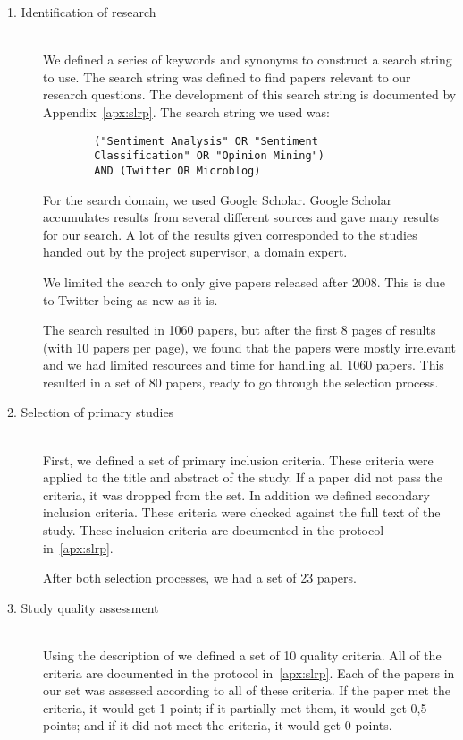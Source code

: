 \begin{description}

	\item[1. Identification of research] \hfill \\
		We defined a series of keywords and synonyms to construct a search string to use. The search string was defined to find papers relevant to our research questions. The development of this search string is documented by Appendix~\ref{apx:slrp}. The search string we used was:
		
		\begin{verbatim}
		("Sentiment Analysis" OR "Sentiment 
		Classification" OR "Opinion Mining") 
		AND (Twitter OR Microblog)
		\end{verbatim}

		For the search domain, we used Google Scholar. Google Scholar accumulates results from several different sources and gave many results for our search. A lot of the results given corresponded to the studies handed out by the project supervisor, a domain expert. 
		
		We limited the search to only give papers released after 2008. This is due to Twitter being as new as it is.
		
		The search resulted in 1060 papers, but after the first 8 pages of results (with 10 papers per page), we found that the papers were mostly irrelevant and we had limited resources and time for handling all 1060 papers. This resulted in a set of 80 papers, ready to go through the selection process.

	 \vspace*{3mm}
	\item[2. Selection of primary studies] \hfill \\
		First, we defined a set of primary inclusion criteria. These criteria were applied to the title and abstract of the study. If a paper did not pass the criteria, it was dropped from the set. In addition we defined secondary inclusion criteria. These criteria were checked against the full text of the study. These inclusion criteria are documented in the protocol in~\autoref{apx:slrp}. 
		
		After both selection processes, we had a set of 23 papers. 

	\item[3. Study quality assessment] \hfill \\
		Using the description of \cite{paper:slrdesc} we defined a set of 10 quality criteria. All of the criteria are documented in the protocol in~\autoref{apx:slrp}. Each of the papers in our set was assessed according to all of these criteria. If the paper met the criteria, it would get 1 point; if it partially met them, it would get 0,5 points; and if it did not meet the criteria, it would get 0 points. 
		

\end{description}
